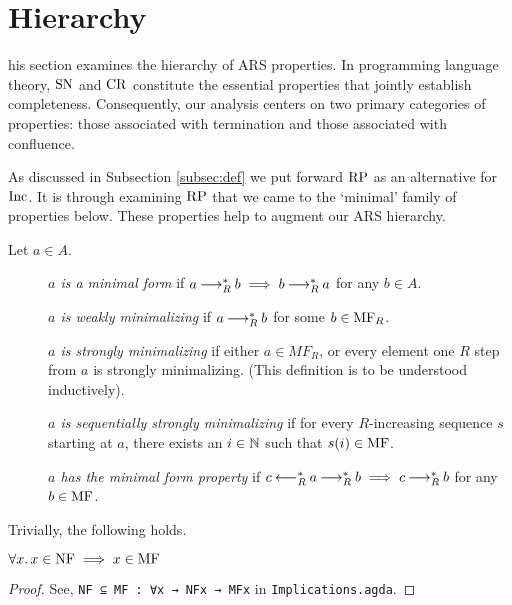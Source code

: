 \section{Hierarchy}
\label{sec:Hierarchy}

\newenvironment{counterexample}[1][]{%
    \refstepcounter{CEcounter} %
    \noindent \scriptsize\textbf{{\theCEcounter } }  #1\par
}

This section examines the hierarchy of ARS properties.
In programming language theory, $\mathrm{SN}$ and $\mathrm{CR}$ constitute the essential properties that
jointly establish completeness.
Consequently, our analysis centers on two primary categories of properties: those associated
with termination and those associated with confluence.

As discussed in Subsection \ref{subsec:def} we put forward $\mathrm{RP}$ as an alternative for $\mathrm{Inc}$. It is through examining $\mathrm{RP}$ that
we came to the `minimal' family of properties below. These properties help to augment our ARS hierarchy.

\begin{definition}\label{def:mf} Let $a \in A$. \hfill
    \begin{description}
        \item[] \emph{$a$ is a minimal form} if $a \mathbin{\longrightarrow_R^*} b \implies b \mathbin{\longrightarrow_R^*} a$ for any $b \in A$.
        \item[] \emph{$a$ is weakly minimalizing} if $a \mathbin{\longrightarrow_R^*} b$ for some $b \in \mathrm{MF}_R$.
        \item[]  \emph{$a$ is strongly minimalizing} if either $a \in MF_R$, or every element one $R$ step from $a$ is strongly minimalizing. (This
        definition is to be understood inductively).
        \item[] \emph{$a$ is sequentially strongly minimalizing} if for every $R$-increasing sequence $s$ starting at $a$, there exists
        an $i \in \mathbb{N}$ such that $s (i) \in \mathrm{MF}$.
        \item[] \emph{$a$ has the minimal form property} if $c \mathbin{\longleftarrow_R^*} a \mathbin{\longrightarrow_R^*} b \implies c \mathbin{\longrightarrow_R^*} b$ for any $b \in \mathrm{MF}$.
    \end{description}
\end{definition}

Trivially, the following holds.
\begin{proposition}\label{prop:nftomf}
    $\forall x.\, x\in \mathrm{NF} \implies x \in \mathrm{MF}$
\end{proposition}
\begin{proof}
    See, \verb|NF ⊆ MF : ∀x → NFx → MFx| in \texttt{Implications.agda}.
\end{proof}

